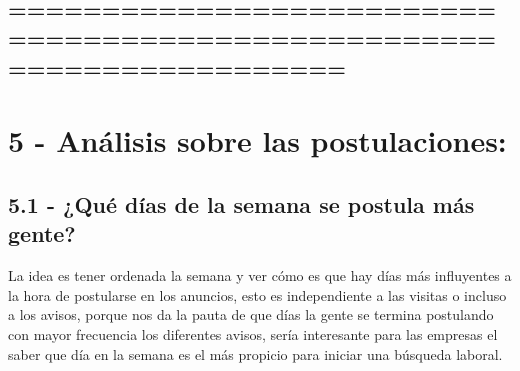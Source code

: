 \documentclass[11pt]{article}
\begin{document}
    \begin{center}
    \end{center}
    { \hspace*{\fill} \\}
    
    \hypertarget{section}{%
\subsection{======================================================================}\label{section}}

    \hypertarget{anuxe1lisis-sobre-las-postulaciones}{%
\section{5 - Análisis sobre las
postulaciones:}\label{anuxe1lisis-sobre-las-postulaciones}}

\hypertarget{quuxe9-duxedas-de-la-semana-se-postula-muxe1s-gente}{%
\subsection{5.1 - ¿Qué días de la semana se postula más
gente?}\label{quuxe9-duxedas-de-la-semana-se-postula-muxe1s-gente}}

La idea es tener ordenada la semana y ver cómo es que hay días más
influyentes a la hora de postularse en los anuncios, esto es
independiente a las visitas o incluso a los avisos, porque nos da la
pauta de que días la gente se termina postulando con mayor frecuencia
los diferentes avisos, sería interesante para las empresas el saber que
día en la semana es el más propicio para iniciar una búsqueda laboral.
\end{document}
